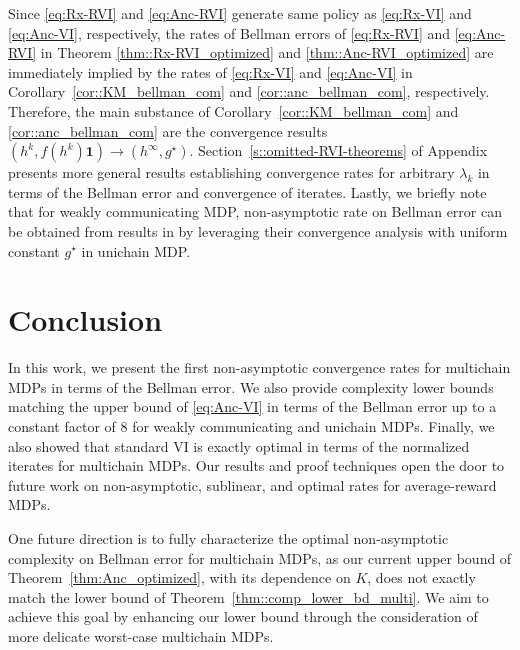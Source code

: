 \documentclass{article} %
\begin{document}
Since \ref{eq:Rx-RVI} and \ref{eq:Anc-RVI} generate same policy as \ref{eq:Rx-VI} and \ref{eq:Anc-VI}, respectively, the rates of Bellman errors of \ref{eq:Rx-RVI} and \ref{eq:Anc-RVI} in Theorem \ref{thm::Rx-RVI_optimized} and \ref{thm::Anc-RVI_optimized} are immediately implied by the rates of \ref{eq:Rx-VI} and \ref{eq:Anc-VI} in Corollary~\ref{cor::KM_bellman_com} and \ref{cor::anc_bellman_com}, respectively. Therefore, the main substance of Corollary~\ref{cor::KM_bellman_com} and \ref{cor::anc_bellman_com} are the convergence results $(h^k,f(h^k)\mathbf{1})\rightarrow(h^\infty,g^{\star})$. Section~\ref{s::omitted-RVI-theorems} of Appendix presents more general results establishing convergence rates for arbitrary $\lambda_k$ in terms of the Bellman error and convergence of iterates. Lastly, we briefly note that for weakly communicating MDP, non-asymptotic rate on Bellman error can be obtained from results in \citet{bravostochastic, bravo2024stochastic} by leveraging their convergence analysis with uniform constant $g^{\star}$ in unichain MDP.

\section{Conclusion}
In this work, we present the first non-asymptotic convergence rates for multichain MDPs in terms of the Bellman error. We also provide complexity lower bounds matching the upper bound of \ref{eq:Anc-VI} in terms of the Bellman error up to a constant factor of $8$ for weakly communicating and unichain MDPs. Finally, we also showed that standard VI is exactly optimal in terms of the normalized iterates for multichain MDPs. 
Our results and proof techniques open the door to future work on non-asymptotic, sublinear, and optimal rates for average-reward MDPs.

One future direction is to fully characterize the optimal non-asymptotic complexity on Bellman error for multichain MDPs, as our current upper bound of Theorem~\ref{thm:Anc_optimized}, with its dependence on $K$, does not exactly match the lower bound of Theorem~\ref{thm::comp_lower_bd_multi}. We aim to achieve this goal by enhancing our lower bound through the consideration of more delicate worst-case multichain MDPs.
\end{document}
